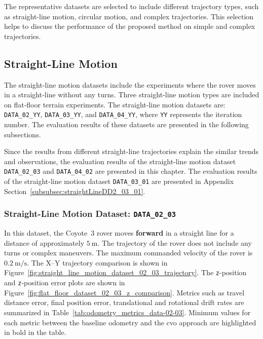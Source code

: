 \documentclass[report.tex]{subfiles}
\begin{document}
    The representative datasets are selected to include different trajectory types, such as straight-line motion, circular motion, and complex trajectories. This selection helps to discuss the performance of the proposed method on simple and complex trajectories. 
    
    \subsection{Straight-Line Motion}
    
    The straight-line motion datasets include the experiments where the rover moves in a straight-line without any turns. Three straight-line motion types are included on flat-floor terrain experiments. The straight-line motion datasets are: \texttt{DATA\_02\_YY}, \texttt{DATA\_03\_YY}, and \texttt{DATA\_04\_YY}, where \texttt{YY} represents the iteration number. The evaluation results of these datasets are presented in the following subsections. 
    
    Since the results from different straight-line trajectories explain the similar trends and observations, the evaluation results of the straight-line motion dataset \texttt{DATA\_02\_03} and \texttt{DATA\_04\_02} are presented in this chapter. The evaluation results of the straight-line motion dataset \texttt{DATA\_03\_01} are presented in Appendix Section~\ref{subsubsec:straightLineDD2_03_01}.
    
    \subsubsection{Straight-Line Motion Dataset: \texttt{DATA\_02\_03}} \label{subsubsec:straightLineD1_02_03}

    In this dataset, the Coyote~3 rover moves \textbf{forward} in a straight line for a distance of approximately $5~\mathrm{m}$. The trajectory of the rover does not include any turns or complex maneuvers. The maximum commanded velocity of the rover is $0.2~\mathrm{m/s}$. The X--Y trajectory comparison is shown in Figure~\ref{fig:straight_line_motion_dataset_02_03_trajectory}. The \texttt{z}-position and \texttt{z}-position error plots are shown in Figure~\ref{fig:flat_floor_dataset_02_03_z_comparison}. Metrics such as travel distance error, final position error, translational and rotational drift rates are summarized in Table~\ref{tab:odometry_metrics_data-02-03}. Minimum values for each metric between the baseline odometry and the \gls{cvo} approach are highlighted in bold in the table. 
    
\end{document}
